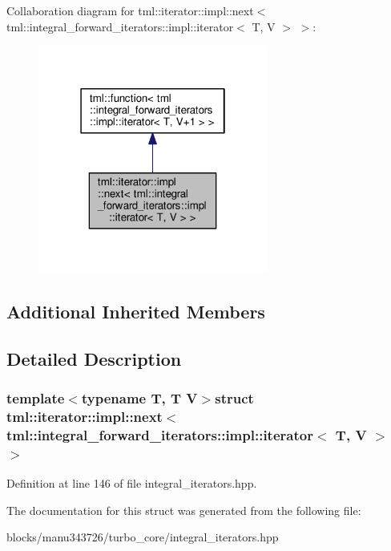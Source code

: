 Collaboration diagram for tml\+:\+:iterator\+:\+:impl\+:\+:next$<$ tml\+:\+:integral\+\_\+forward\+\_\+iterators\+:\+:impl\+:\+:iterator$<$ T, V $>$ $>$\+:
\nopagebreak
\begin{figure}[H]
\begin{center}
\leavevmode
\includegraphics[width=214pt]{structtml_1_1iterator_1_1impl_1_1next_3_01tml_1_1integral__forward__iterators_1_1impl_1_1iterato0ea295969b73f71cc3ce8ca5ef6a2c21}
\end{center}
\end{figure}
\subsection*{Additional Inherited Members}


\subsection{Detailed Description}
\subsubsection*{template$<$typename T, T V$>$struct tml\+::iterator\+::impl\+::next$<$ tml\+::integral\+\_\+forward\+\_\+iterators\+::impl\+::iterator$<$ T, V $>$ $>$}



Definition at line 146 of file integral\+\_\+iterators.\+hpp.



The documentation for this struct was generated from the following file\+:\begin{DoxyCompactItemize}
\item 
blocks/manu343726/turbo\+\_\+core/integral\+\_\+iterators.\+hpp\end{DoxyCompactItemize}
